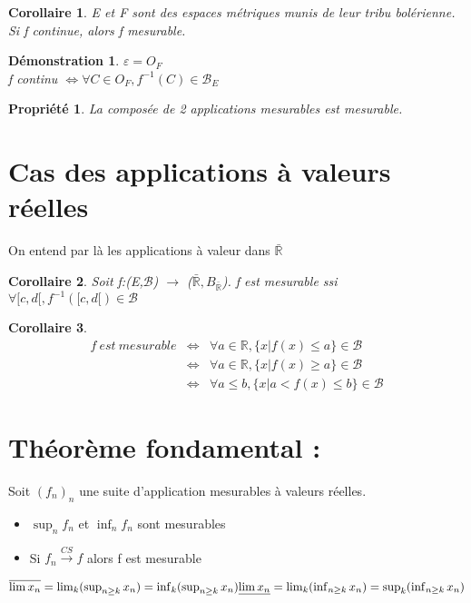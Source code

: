 \documentclass{article}
\theoremstyle{mes_theoremes}
\newtheorem{coro}{Corollaire}[section]
\newtheorem{prop}{Propriété}[section]
\newtheorem*{dem}{Démonstration}
\begin{document}
\begin{coro}
E et F sont des espaces métriques munis de leur tribu bolérienne. \\
Si f continue, alors f mesurable.
\end{coro}

\begin{dem}
$\varepsilon=O_F$ \\
f continu $\Leftrightarrow \forall C\in O_F, f^{-1}(C)\in \mathcal{B}_E$
\end{dem}

\begin{prop}
La composée de 2 applications mesurables est mesurable.
\end{prop}


\section{Cas des applications à valeurs réelles}
On entend par là les applications à valeur dans $\bar{\mathbb{R}}$
\begin{coro}
Soit f:(E,$\mathcal{B}$) $\rightarrow$ ($\bar{\mathbb{R}}, B_{\bar{\mathbb{R}}}$). f est mesurable ssi $\forall [c,d[, f^{-1}([c,d[)\in\mathcal{B}$
\end{coro}

\begin{coro}
\begin{eqnarray*}
f\ est\ mesurable &\Leftrightarrow& \forall a\in\mathbb{R}, \{x|f(x)\leq a\}\in \mathcal{B} \\
&\Leftrightarrow& \forall a\in\mathbb{R}, \{x|f(x)\geq a\}\in \mathcal{B} \\
&\Leftrightarrow& \forall a\leq b, \{x|a<f(x)\leq b\}\in \mathcal{B}
\end{eqnarray*}
\end{coro}

\section*{Théorème fondamental :}
Soit $(f_n)_n$ une suite d'application mesurables à valeurs réelles.
\begin{itemize}
\item $\sup_n f_n$ et $\inf_n f_n$ sont mesurables
\item Si $f_n \xrightarrow{CS} f$ alors f est mesurable
\end{itemize}

$\overline{\lim x_n} = \lim_k (\sup_{n \geq k} x_n) = \inf_k (\sup_{n \geq k} x_n) \\
\underline{\lim x_n} = \lim_k (\inf_{n \geq k} x_n) = \sup_k (\inf_{n \geq k} x_n)$
\end{document}
